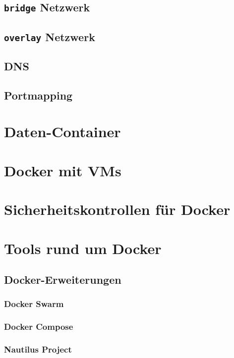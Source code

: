 \documentclass[../main.tex]{subfiles}
\begin{document}
		\subsection{\texttt{bridge} Netzwerk}
		\subsection{\texttt{overlay} Netzwerk}
		\subsection{DNS}
		\subsection{Portmapping}
	\section{Daten-Container}
	\section{Docker mit \acrshort{VM}s}
  \section{Sicherheitskontrollen für Docker}
	\section{Tools rund um Docker}
    \subsection{Docker-Erweiterungen}
      \subsubsection{Docker Swarm}
      \subsubsection{Docker Compose}
      \subsubsection{Nautilus Project}
\end{document}
